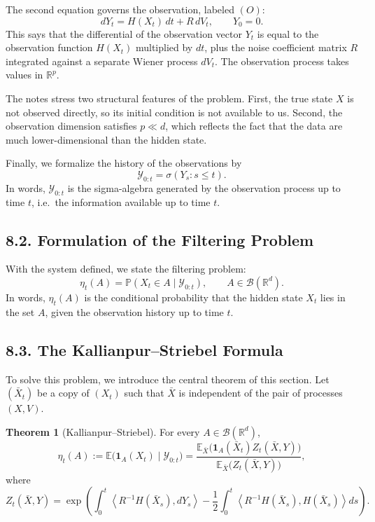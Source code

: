 \documentclass[11pt]{article}
\theoremstyle{definition}
\newtheorem{theorem}{Theorem}
\theoremstyle{remark}
\begin{document}
The second equation governs the observation, labeled $(O)$:
\[
dY_t = H(X_t)\,dt + R\,dV_t,
\qquad
Y_0=0.
\]
This says that the differential of the observation vector $Y_t$ is equal to the observation function $H(X_t)$ multiplied by $dt$, plus the noise coefficient matrix $R$ integrated against a separate Wiener process $dV_t$. The observation process takes values in $\mathbb R^p$.

The notes stress two structural features of the problem. First, the true state $X$ is not observed directly, so its initial condition is not available to us. Second, the observation dimension satisfies $p\ll d$, which reflects the fact that the data are much lower-dimensional than the hidden state.

Finally, we formalize the history of the observations by
\[
\mathcal Y_{0:t}=\sigma(Y_s:s\le t).
\]
In words, $\mathcal Y_{0:t}$ is the sigma-algebra generated by the observation process up to time $t$, i.e.\ the information available up to time $t$.

\subsection*{8.2. Formulation of the Filtering Problem}
With the system defined, we state the filtering problem:
\[
\eta_t(A)=\mathbb P(X_t\in A\mid \mathcal Y_{0:t}),
\qquad
A\in\mathcal B(\mathbb R^d).
\]
In words, $\eta_t(A)$ is the conditional probability that the hidden state $X_t$ lies in the set $A$, given the observation history up to time $t$.

\subsection*{8.3. The Kallianpur--Striebel Formula}
To solve this problem, we introduce the central theorem of this section. Let $(\bar X_t)$ be a copy of $(X_t)$ such that $\bar X$ is independent of the pair of processes $(X,V)$.

\begin{theorem}[Kallianpur--Striebel]
For every $A\in\mathcal B(\mathbb R^d)$,
\[
\eta_t(A)
:=
\mathbb E\bigl(\mathbf 1_A(X_t)\mid \mathcal Y_{0:t}\bigr)
=
\frac{\mathbb E_{\bar X}\bigl(\mathbf 1_A(\bar X_t)Z_t(\bar X,Y)\bigr)}
{\mathbb E_{\bar X}\bigl(Z_t(\bar X,Y)\bigr)},
\]
where
\[
Z_t(\bar X,Y)
=
\exp\left(
\int_0^t \left\langle R^{-1}H(\bar X_s),dY_s\right\rangle
-\frac12\int_0^t \left\langle R^{-1}H(\bar X_s),H(\bar X_s)\right\rangle ds
\right).
\]
\end{theorem}
\end{document}
